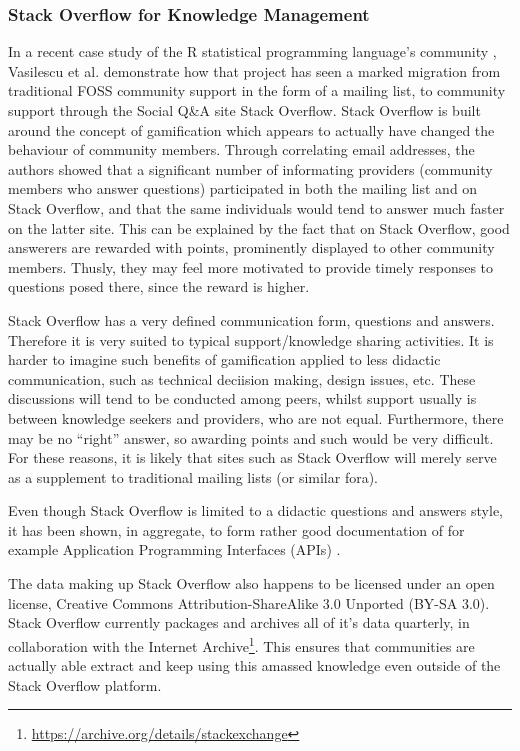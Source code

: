 \documentclass[a4paper,11pt]{article} %
\begin{document}
\subsubsection{Stack Overflow for Knowledge Management}
In a recent case study of the R statistical programming language's
community \cite{Vasilescu14StackOverflow}, Vasilescu et
al. demonstrate how that project has seen a marked migration from
traditional FOSS community support in the form of a mailing list, to
community support through the Social Q\&{}A site
Stack Overflow. Stack Overflow is built around the concept of
gamification\cite{deterding2011game} which appears to actually have
changed the behaviour of community members. Through correlating email
addresses, the authors showed that a significant number of informating
providers (community members who answer questions) participated in
both the mailing list and on Stack Overflow, and that the same
individuals would tend to answer much faster on the latter site. This
can be explained by the fact that on Stack Overflow, good answerers are
rewarded with points, prominently displayed to other community
members. Thusly, they may feel more motivated to provide timely
responses to questions posed there, since the reward is higher.


Stack Overflow has a very defined communication form, questions and
answers. Therefore it is very suited to typical support/knowledge
sharing activities. It is harder to imagine such benefits of
gamification applied to less didactic communication, such as technical
deciision making, design issues, etc. These discussions will tend to
be conducted among peers, whilst support usually is between knowledge
seekers and providers, who are not equal. Furthermore, there may be no
``right'' answer, so awarding points and such would be very
difficult. For these reasons, it is likely that sites such as
Stack Overflow will merely serve as a supplement to traditional mailing
lists (or similar fora).

Even though Stack Overflow is limited to a didactic questions and
answers style, it has been shown, in aggregate, to form rather good
documentation of for example Application Programming Interfaces (APIs)
\cite{parnin2012crowd}.

The data making up Stack Overflow also happens to be licensed under an
open license, Creative Commons Attribution-ShareAlike 3.0 Unported
(BY-SA 3.0). Stack Overflow currently packages and archives all of
it's data quarterly, in collaboration with the Internet
Archive\footnote{\url{https://archive.org/details/stackexchange}}. This
ensures that communities are actually able extract and keep using this
amassed knowledge even outside of the Stack Overflow platform.
\end{document}
